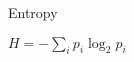 \documentclass[multi=page, border=1cm]{standalone}
\newcommand{\card}[2]{
    \begin{page}\Huge #1\end{page}
    \begin{page}\Huge #2\end{page}
}
\newcommand{\mathcard}[2]{\card{#1}{\(#2\)}}
\begin{document}
\mathcard{Entropy}{H = -\sum_i{p_i\log_2{p_i}}}
\end{document}
